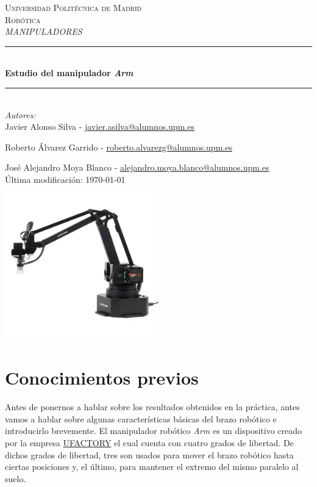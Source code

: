 \documentclass[a4paper,12pt]{article}
\begin{document}
\begin{titlepage}

    \newcommand{\HRule}{\rule{\linewidth}{0.5mm}}
    \center

    \textsc{\LARGE Universidad Politécnica de Madrid}\\[1cm]

    \textsc{\Large Robótica}\\[0.2cm]
    \textsc{\large \textit{MANIPULADORES}}\\[1cm]
    \HRule \\[0.8cm]
    { \huge \bfseries Estudio del manipulador \textit{{\textmu}Arm}}\\[0.7cm]
    \HRule \\[2cm]
    \large
    \emph{Autores:}\\
    Javier Alonso Silva - \href{mailto:javier.asilva@alumnos.upm.es}{javier.asilva@alumnos.upm.es}

    Roberto Álvarez Garrido - \href{mailto:roberto.alvarezg@alumnos.upm.es}{roberto.alvarezg@alumnos.upm.es}

    José Alejandro Moya Blanco - \href{mailto:alejandro.moya.blanco@alumnos.upm.es}{alejandro.moya.blanco@alumnos.upm.es}\\[1.5cm]
    {\large Última modificación: \today}\\[2cm]
    \includegraphics[width=0.5\textwidth]{images/uarm.jpg}\\[1cm]
\end{titlepage}

\section*{Conocimientos previos}
\label{sec:previous_knowledge}

Antes de ponernos a hablar sobre los resultados obtenidos en la práctica,
antes vamos a hablar sobre algunas características básicas del brazo robótico e
introducirlo brevemente.
El manipulador robótico \emph{{\textmu}Arm} es un dispositivo creado por la empresa
\href{https://www.ufactory.cc/#/}{UFACTORY} el cual cuenta con cuatro grados de libertad.
De dichos grados de libertad, tres son usados para mover el brazo robótico hasta ciertas
posiciones y, el último, para mantener el extremo del mismo paralelo al suelo.
\end{document}
